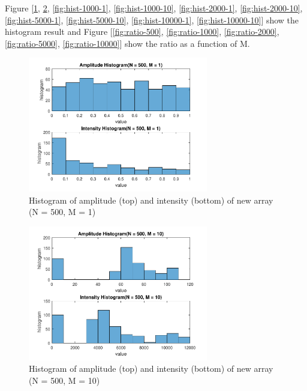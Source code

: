 \documentclass{article}
\begin{document}
Figure [\ref{fig:hist-500-1}, \ref{fig:hist-500-10}, \ref{fig:hist-1000-1}, \ref{fig:hist-1000-10}, \ref{fig:hist-2000-1}, \ref{fig:hist-2000-10}, 
\ref{fig:hist-5000-1}, \ref{fig:hist-5000-10}, \ref{fig:hist-10000-1}, \ref{fig:hist-10000-10}] show the histogram result and Figure
[\ref{fig:ratio-500}, \ref{fig:ratio-1000}, \ref{fig:ratio-2000}, \ref{fig:ratio-5000}, \ref{fig:ratio-10000}] show the ratio as a function of
M.

\begin{figure}[H]
	\centering
	\includegraphics[width = 0.7\textwidth]{src/2pi/hist_500_1.pdf}
	\caption{Histogram of amplitude (top) and intensity (bottom) of new array (N = 500, M = 1)}
	\label{fig:hist-500-1}
\end{figure}
\begin{figure}[H]
	\centering
	\includegraphics[width = 0.7\textwidth]{src/2pi/hist_500_10.pdf}
	\caption{Histogram of amplitude (top) and intensity (bottom) of new array (N = 500, M = 10)}
	\label{fig:hist-500-10}
\end{figure}
\end{document}
